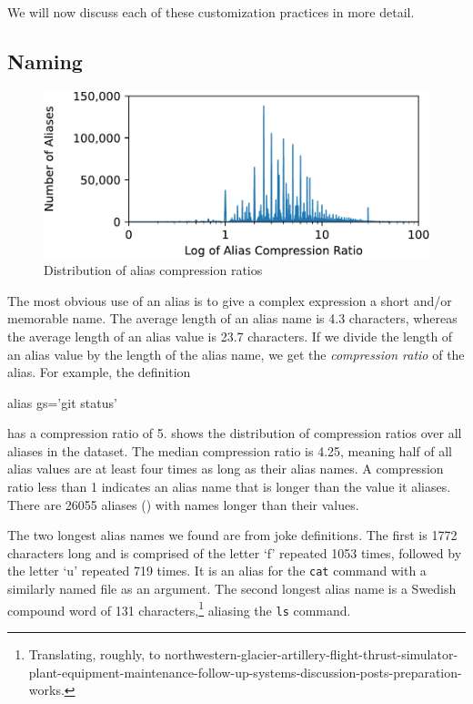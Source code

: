 We will now discuss each of these customization practices in more detail.


\subsection{Naming}

\begin{figure}
    \centering
    \includegraphics[width=0.95\columnwidth]{figures/compression.pdf}
    \caption{Distribution of alias compression ratios}
    \label{fig:compression}
\end{figure}

The most obvious use of an alias is to give a complex expression a short and/or memorable name.
The average length of an alias name is 4.3 characters, whereas the average length of an alias value is 23.7 characters.
If we divide the length of an alias value by the length of the alias name, we get the \emph{compression ratio} of the alias.
For example, the definition
\begin{CVerbatim}
alias gs='git status'
\end{CVerbatim}
has a compression ratio of 5.
 shows the distribution of compression ratios over all aliases in the dataset.
The median compression ratio is 4.25, meaning half of all alias values are at least four times as long as their alias names.
A compression ratio less than 1 indicates an alias name that is longer than the value it aliases.
There are \num{26055} aliases () with names longer than their values.

The two longest alias names we found are from joke definitions.
The first is \num{1772} characters long and is comprised of the letter `f' repeated \num{1053} times, followed by the letter `u' repeated 719 times.
It is an alias for the \verb|cat| command with a similarly named file as an argument.
The second longest alias name is a Swedish compound word of \num{131} characters,\footnote{Translating, roughly, to northwestern-glacier-artillery-flight-thrust-simulator-plant-equipment-maintenance-follow-up-systems-discussion-posts-preparation-works.} aliasing the \verb|ls| command.

